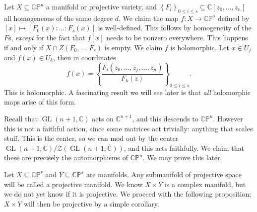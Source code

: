Let $X\subseteq \mathbb{C} \mathbb{P} ^n$ a manifold or projective variety, and $\left\{ F_i \right\} _{0\leq i\leq s} \subseteq \mathbb{C} [z_0, \ldots ,z_n]$ all homogeneous of the same degree $d$. We claim the map $f : X \to \mathbb{C} \mathbb{P} ^s$ defined by $[x]\mapsto [F_0(x): \ldots :F_s(x)]$ is well-defined. This follows by homogeneity of the $F$s, \emph{except} for the fact that $f[x]$ needs to be nonzero everywhere. This happens if and only if $X \cap Z(F_0, \ldots ,F_s)$ is empty. We claim $f$ is holomorphic. Let $x\in U_j$ and $f(x)\in U_k$, then in coordinates
\[
	f(x) = \left\{ \frac{F_i(z_0, \ldots , \hat{z}_j, \ldots ,z_n)}{F_k(z)}  \right\}_{0\leq i\leq s}  
.\]
This is holomorphic. A fascinating result we will see later is that \emph{all} holomorphic maps arise of this form.

Recall that $\operatorname{GL}(n+1,\mathbb{C} )$ acts on $\mathbb{C} ^{n+1}$, and this descends to $\mathbb{C} \mathbb{P} ^n$. However this is not a faithful action, since some matrices act trivially: anything that scales stuff. This is the center, so we can mod out by the center $\operatorname{GL} (n+1,\mathbb{C} ) / \mathcal{Z}(\operatorname{GL} (n+1,\mathbb{C} ))$, and this acts faithfully. We claim that these are precisely the automorphisms of $\mathbb{C} \mathbb{P} ^n$. We may prove this later.


Let $X\subseteq \mathbb{C} \mathbb{P} ^r$ and $Y\subseteq \mathbb{C} \mathbb{P} ^s$ are manifolds. Any submanifold of projective space will be called a projective manifold. We know $X\times Y$ is a  complex manifold, but we do not yet know if it is projective. We proceed with the following proposition; $X\times Y$ will then be projective by a simple corollary.

